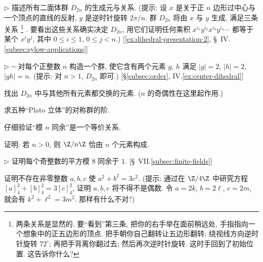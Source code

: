 \begin{prob}
\label{ex:dihedral-presentation}
$\triangleright$ 描述所有二面体群 $D_{2n}$ 的生成元与关系. (提示: 设 $x$ 是关于正 $n$ 边形过中心与一个顶点的直线的反射, $y$ 是逆时针旋转 $2\pi/n$. 群 $D_{2n}$ 将由 $x$ 与 $y$ 生成, 满足三条关系%
\footnote{两条关系是显然的. 要``看到''第三条, 把你的右手举在面前稍远处, 手指指向一个想象中的正五边形的顶点. 把手朝你自己翻转让五边形翻转; 绕视线方向逆时针旋转 $72^{\circ}$; 再把手背离你翻过去; 然后再次逆时针旋转. 这时手回到了初始位置. 这告诉你什么?}%
. 要看出这些关系确实决定 $D_{2n}$, 用它们证明任何乘积 $x^{i_1} y^{i_2} x^{i_3} y^{i_4} \cdots$ 都等于某个 $x^i y^j$, 其中 $0 \leq i \leq 1$, $0 \leq j < n$.) [\ref{ex:dihedral-presentation-2}, \S~IV.\ref{subsec:sylow-applications}]
\end{prob}

\begin{prob}
\label{ex:order-gh-n}
$\triangleright\ \neg$ 对每个正整数 $n$ 构造一个群, 使它含有两个元素 $g$, $h$ 满足 $|g| = 2$, $|h| = 2$, $|gh| = n$. (提示: 对 $n > 1$, $D_{2n}$ 即可.) [\S\ref{subsec:order}, IV.\ref{ex:center-dihedral}]
\end{prob}

\begin{prob}
\label{ex:central-dihedral}
找出 $D_{2n}$ 中与其他所有元素都交换的元素. ($n$ 的奇偶性在这里起作用.)
\end{prob}

\begin{prob}
\label{ex:platonic-solids}
求五种``Plato 立体''的对称群的阶.
\end{prob}

\begin{prob}
\label{ex:congruence-equiv}
仔细验证``模 $n$ 同余''是一个等价关系.
\end{prob}

\begin{prob}
\label{ex:zn-precisely}
证明: 若 $n > 0$, 则 $\Z/n\Z$ 恰由 $n$ 个元素构成.
\end{prob}

\begin{prob}
\label{ex:odd-square}
$\triangleright$ 证明每个奇整数的平方模 $8$ 同余于 $1$. [\S~VII.\ref{subsec:finite-fields}]
\end{prob}

\begin{prob}
\label{ex:no-solution-3}
证明不存在非零整数 $a, b, c$ 使 $a^2 + b^2 = 3c^2$. (提示: 通过在 $\Z/4\Z$ 中研究方程 $[a]_4^2 + [b]_4^2 = 3[c]_4^2$, 证明 $a, b, c$ 将不得不是偶数. 令 $a = 2k$, $b = 2\ell$, $c = 2m$, 就会有 $k^2 + \ell^2 = 3m^2$. 那样有什么不对?)
\end{prob}

